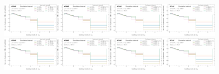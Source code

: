 \begin{figure}[h!]
\includegraphics[width=0.25\textwidth,page=9]{figures/SimResults/MultiFold_Lepton_SystEffect.pdf}\includegraphics[width=0.25\textwidth,page=10]{figures/SimResults/MultiFold_Lepton_SystEffect.pdf}\includegraphics[width=0.25\textwidth,page=11]{figures/SimResults/MultiFold_Lepton_SystEffect.pdf}\includegraphics[width=0.25\textwidth,page=12]{figures/SimResults/MultiFold_Lepton_SystEffect.pdf}\\
\includegraphics[width=0.25\textwidth,page=13]{figures/SimResults/MultiFold_Lepton_SystEffect.pdf}\includegraphics[width=0.25\textwidth,page=14]{figures/SimResults/MultiFold_Lepton_SystEffect.pdf}\includegraphics[width=0.25\textwidth,page=15]{figures/SimResults/MultiFold_Lepton_SystEffect.pdf}\includegraphics[width=0.25\textwidth,page=16]{figures/SimResults/MultiFold_Lepton_SystEffect.pdf}\\

\end{figure}
